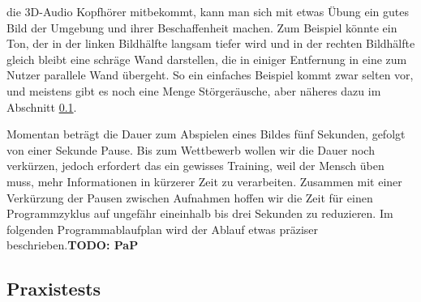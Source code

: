 \documentclass[a4paper,12pt,ngerman]{scrartcl}
\begin{document}
die 3D-Audio Kopfhörer mitbekommt, kann man sich mit etwas Übung ein gutes Bild der Umgebung und ihrer
Beschaffenheit machen. Zum Beispiel könnte ein Ton, der in der linken Bildhälfte langsam tiefer wird und 
in der rechten Bildhälfte gleich bleibt eine schräge Wand darstellen, die in einiger Entfernung in eine
zum Nutzer parallele Wand übergeht. So ein einfaches Beispiel kommt zwar selten vor, und meistens gibt es
noch eine Menge Störgeräusche, aber näheres dazu im Abschnitt \ref{testsAndResults}.\par 
Momentan beträgt die Dauer zum Abspielen eines Bildes fünf Sekunden, gefolgt von einer Sekunde 
Pause. Bis zum Wettbewerb wollen wir die Dauer noch verkürzen, jedoch erfordert das ein gewisses 
Training, weil der Mensch üben muss, mehr Informationen in kürzerer Zeit zu verarbeiten. Zusammen mit 
einer Verkürzung der Pausen zwischen Aufnahmen hoffen wir die Zeit für einen Programmzyklus auf ungefähr
eineinhalb bis drei Sekunden zu reduzieren. Im folgenden Programmablaufplan wird der Ablauf etwas 
präziser beschrieben.\textbf{TODO: PaP} \newline

\subsection{Praxistests} \label{testsAndResults}
\end{document}
